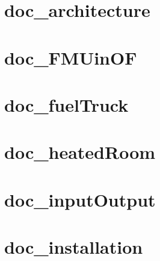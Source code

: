 \documentclass[twoside]{book}
\newcommand{\+}{\discretionary{\mbox{\scriptsize$\hookleftarrow$}}{}{}}
\begin{document}
\chapter{doc\+\_\+architecture}
\label{md__home_carlo_data_GeN-Foam_GeN-Foam_ffn_GeN-Foam_GeN-Foam_FMU4FOAM_docs_pages_doc_doc_architecture}

\chapter{doc\+\_\+\+F\+M\+Uin\+OF}
\label{md__home_carlo_data_GeN-Foam_GeN-Foam_ffn_GeN-Foam_GeN-Foam_FMU4FOAM_docs_pages_doc_doc_FMUinOF}

\chapter{doc\+\_\+fuel\+Truck}
\label{md__home_carlo_data_GeN-Foam_GeN-Foam_ffn_GeN-Foam_GeN-Foam_FMU4FOAM_docs_pages_doc_doc_fuelTruck}

\chapter{doc\+\_\+heated\+Room}
\label{md__home_carlo_data_GeN-Foam_GeN-Foam_ffn_GeN-Foam_GeN-Foam_FMU4FOAM_docs_pages_doc_doc_heatedRoom}

\chapter{doc\+\_\+input\+Output}
\label{md__home_carlo_data_GeN-Foam_GeN-Foam_ffn_GeN-Foam_GeN-Foam_FMU4FOAM_docs_pages_doc_doc_inputOutput}

\chapter{doc\+\_\+installation}
\label{md__home_carlo_data_GeN-Foam_GeN-Foam_ffn_GeN-Foam_GeN-Foam_FMU4FOAM_docs_pages_doc_doc_installation}

\end{document}
